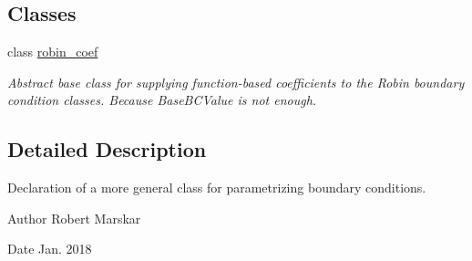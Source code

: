 \subsection*{Classes}
\begin{DoxyCompactItemize}
\item 
class \hyperlink{classrobin__coef}{robin\+\_\+coef}
\begin{DoxyCompactList}\small\item\em Abstract base class for supplying function-\/based coefficients to the Robin boundary condition classes. Because Base\+B\+C\+Value is not enough. \end{DoxyCompactList}\end{DoxyCompactItemize}


\subsection{Detailed Description}
Declaration of a more general class for parametrizing boundary conditions. 

\begin{DoxyAuthor}{Author}
Robert Marskar 
\end{DoxyAuthor}
\begin{DoxyDate}{Date}
Jan. 2018 
\end{DoxyDate}
